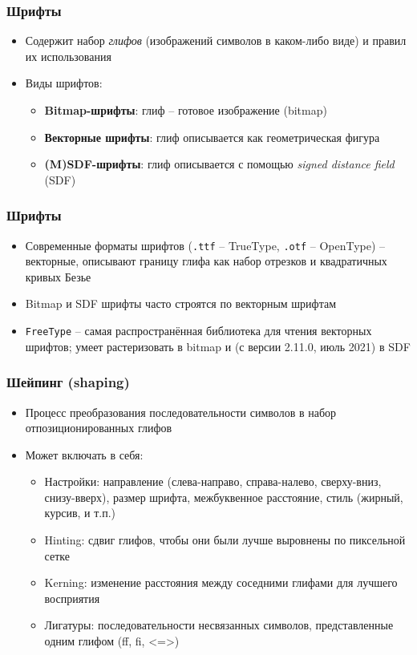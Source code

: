 \documentclass{beamer}
\begin{document}
\begin{frame}[fragile]
\frametitle{Шрифты}
\begin{itemize}
\item Содержит набор \textit{глифов} (изображений символов в каком-либо виде) и правил их использования
\pause
\item Виды шрифтов:
\pause
\begin{itemize}
\item \textbf{Bitmap-шрифты}: глиф -- готовое изображение (bitmap)
\pause
\item \textbf{Векторные шрифты}: глиф описывается как геометрическая фигура
\pause
\item \textbf{(M)SDF-шрифты}: глиф описывается с помощью \textit{signed distance field} (SDF)
\end{itemize}
\end{itemize}
\end{frame}

\begin{frame}[fragile]
\frametitle{Шрифты}
\begin{itemize}
\item Современные форматы шрифтов (\verb|.ttf| -- TrueType, \verb|.otf| -- OpenType) -- векторные, описывают границу глифа как набор отрезков и квадратичных кривых Безье
\pause
\item Bitmap и SDF шрифты часто строятся по векторным шрифтам
\pause
\item \verb|FreeType| -- самая распространённая библиотека для чтения векторных шрифтов; умеет растеризовать в bitmap и (с версии 2.11.0, июль 2021) в SDF
\end{itemize}
\end{frame}

\begin{frame}[fragile]
\frametitle{Шейпинг (shaping)}
\begin{itemize}
\item Процесс преобразования последовательности символов в набор отпозиционированных глифов
\pause
\item Может включать в себя:
\pause
\begin{itemize}
\item Настройки: направление (слева-направо, справа-налево, сверху-вниз, снизу-вверх), размер шрифта, межбуквенное расстояние, стиль (жирный, курсив, и т.п.)
\pause
\item Hinting: сдвиг глифов, чтобы они были лучше выровнены по пиксельной сетке
\pause
\item Kerning: изменение расстояния между соседними глифами для лучшего восприятия
\pause
\item Лигатуры: последовательности несвязанных символов, представленные одним глифом (ff, fi, <=>)
\end{itemize}
\end{itemize}
\end{frame}
\end{document}
